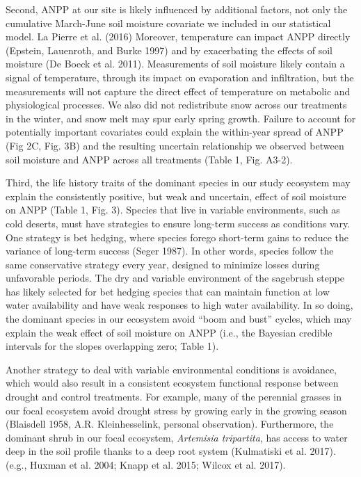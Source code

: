 \documentclass[fleqn,10pt,lineno]{wlpeerj} %
\begin{document}
Second, ANPP at our site is likely influenced by additional factors, not
only the cumulative March-June soil moisture covariate we included in
our statistical model.  La Pierre et al. (2016)
Moreover, temperature can impact ANPP directly (Epstein, Lauenroth, and
Burke 1997) and by exacerbating the effects of soil moisture (De Boeck
et al. 2011). Measurements of soil moisture likely contain a signal of
temperature, through its impact on evaporation and infiltration, but the
measurements will not capture the direct effect of temperature on
metabolic and physiological processes. We also did not redistribute snow
across our treatments in the winter, and snow melt may spur early spring
growth. Failure to account for potentially important covariates could
explain the within-year spread of ANPP (Fig 2C, Fig. 3B) and the
resulting uncertain relationship we observed between soil moisture and
ANPP across all treatments (Table 1, Fig. A3-2).

Third, the life history traits of the dominant species in our study
ecosystem may explain the consistently positive, but weak and uncertain,
effect of soil moisture on ANPP (Table 1, Fig. 3). Species that live in
variable environments, such as cold deserts, must have strategies to
ensure long-term success as conditions vary. One strategy is bet
hedging, where species forego short-term gains to reduce the variance of
long-term success (Seger 1987). In other words, species follow the same
conservative strategy every year, designed to minimize losses during
unfavorable periods. The dry and variable environment of the sagebrush
steppe has likely selected for bet hedging species that can maintain
function at low water availability and have weak responses to high water
availability. In so doing, the dominant species in our ecosystem avoid
``boom and bust'' cycles, which may explain the weak effect of soil
moisture on ANPP (i.e., the Bayesian credible intervals for the slopes
overlapping zero; Table 1).

Another strategy to deal with variable environmental conditions is
avoidance, which would also result in a consistent ecosystem functional
response between drought and control treatments. For example, many of
the perennial grasses in our focal ecosystem avoid drought stress by
growing early in the growing season (Blaisdell 1958, A.R.
Kleinhesselink, personal observation). Furthermore, the dominant shrub
in our focal ecosystem, \emph{Artemisia tripartita}, has access to water
deep in the soil profile thanks to a deep root system (Kulmatiski et al.
2017).
(e.g., Huxman et al. 2004; Knapp et al. 2015; Wilcox et al. 2017).
\end{document}
